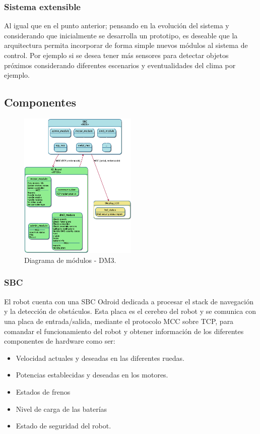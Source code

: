 \documentclass[withindex,glossary]{cam-thesis}
\begin{document}
\subsubsection{Sistema extensible}
Al igual que en el punto anterior; pensando en la evolución del sistema y considerando que inicialmente se desarrolla un prototipo, es deseable que la arquitectura permita incorporar de forma simple nuevos módulos al sistema de control. Por ejemplo si se desea tener más sensores para detectar objetos próximos considerando diferentes escenarios y eventualidades del clima por ejemplo.

\subsection{Componentes}

\begin{figure}[H]
\centering
\includegraphics[width=0.5\textwidth]{images/DM3_Modules}
\caption[Diagrama de componentes de módulos]{Diagrama de módulos - DM3.}
\end{figure}

\subsubsection{SBC}
El robot cuenta con una \gls{SBC} Odroid dedicada a procesar el stack de navegación y la detección de obstáculos. Esta placa es el cerebro del robot y se comunica con una placa de entrada/salida, mediante el protocolo MCC sobre TCP, para comandar el funcionamiento del robot y obtener información de los diferentes componentes de hardware como ser: 
\begin{itemize}
	\item Velocidad actuales y deseadas en las diferentes ruedas.
	\item Potencias establecidas y deseadas en los motores.
	\item Estados de frenos
	\item Nivel de carga de las baterías
	\item Estado de seguridad del robot.
\end{itemize}
\end{document}
